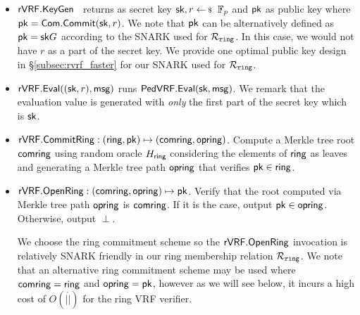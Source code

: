 \begin{itemize}
	\item ${\mathsf{rVRF}}.{\mathsf{KeyGen}}$ \, returns as secret key $\sk,r \leftsample \F_p$ and $ \mathsf{pk} $ as public key where $ \mathsf{pk} = \mathsf{Com}.\mathsf{Commit}(\mathsf{sk},r)  $. We note that $ \mathsf{pk}  $ can be alternatively defined as $ \mathsf{pk} = \mathsf{sk} G $ according to the SNARK used for $ \mathcal{R}_{\mathtt{ring}} $. In this case, we would not have $ r $ as a part of the secret key.  We provide one optimal public key design in \S\ref{subsec:rvrf_faster} for our SNARK used for $ \mathcal{R}_{\mathtt{ring}} $. 
	
	\item ${\mathsf{rVRF}}.{\mathsf{Eval}}((\mathsf{sk},r), \mathsf{msg}) $ runs ${\mathsf{PedVRF}}.{\mathsf{Eval}}(\mathsf{sk},\mathsf{msg})$. We remark that the evaluation value is generated with \emph{only} the first part of the secret key which is $ \mathsf{sk} $.
	
	\item $ {\mathsf{rVRF}}.{\mathsf{CommitRing}}: (\mathsf{ring},\mathsf{pk}) \mapsto (\mathsf{comring},\mathsf{opring})$. Compute a Merkle tree root $\mathsf{comring}  $ using random oracle $ H_\mathsf{ring} $ considering the elements of $ \mathsf{ring} $ as leaves and generating a  Merkle tree path $ \mathsf{opring} $ that verifies $ \mathsf{pk} \in \mathsf{ring} $.
	
	\item $ {\mathsf{rVRF}}.{\mathsf{OpenRing}}: (\mathsf{comring}, \mathsf{opring}) \mapsto \mathsf{pk} $. Verify that the root computed via Merkle tree path $ \mathsf{opring} $ is  $ \mathsf{comring} $. If it is the case, output $ \mathsf{pk} \in \mathsf{opring} $. Otherwise, output $ \perp $. 
	
	We choose the ring commitment scheme so the ${\mathsf{rVRF}}.{\mathsf{OpenRing}}$ invocation
	is relatively SNARK friendly in our ring membership relation $ \mathcal{R}_{\mathtt{ring}} $. We note that an alternative ring commitment scheme may be used 
	where $ \mathsf{comring} = \mathsf{ring} $ and $ \mathsf{opring} = \mathsf{pk} $, however as we will see below, it incurs a high cost of $O(|\ring|)$ for the ring VRF verifier. 
		
\end{itemize}

